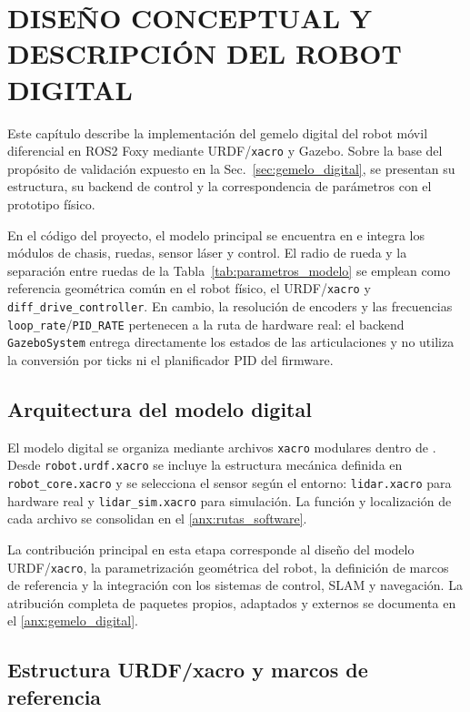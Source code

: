 \chapter{DISEÑO CONCEPTUAL Y DESCRIPCIÓN DEL ROBOT DIGITAL}
\label{ch:robot_digital}

Este capítulo describe la implementación del gemelo digital del robot móvil diferencial en \gls{ROS2} Foxy mediante URDF/\texttt{xacro} y Gazebo. Sobre la base del propósito de validación expuesto en la Sec.~\ref{sec:gemelo_digital}, se presentan su estructura, su backend de control y la correspondencia de parámetros con el prototipo físico.

En el código del proyecto, el modelo principal se encuentra en  e integra los módulos de chasis, ruedas, sensor láser y control. El radio de rueda y la separación entre ruedas de la Tabla~\ref{tab:parametros_modelo} se emplean como referencia geométrica común en el robot físico, el URDF/\texttt{xacro} y \texttt{diff\_drive\_controller}. En cambio, la resolución de encoders y las frecuencias \texttt{loop\_rate}/\texttt{PID\_RATE} pertenecen a la ruta de hardware real: el backend \texttt{GazeboSystem} entrega directamente los estados de las articulaciones y no utiliza la conversión por ticks ni el planificador PID del firmware.

\section{Arquitectura del modelo digital}
\label{sec:atribucion}

El modelo digital se organiza mediante archivos \texttt{xacro} modulares dentro de . Desde \texttt{robot.urdf.xacro} se incluye la estructura mecánica definida en \texttt{robot\_core.xacro} y se selecciona el sensor según el entorno: \texttt{lidar.xacro} para hardware real y \texttt{lidar\_sim.xacro} para simulación. La función y localización de cada archivo se consolidan en el \ref{anx:rutas_software}.

La contribución principal en esta etapa corresponde al diseño del modelo URDF/\texttt{xacro}, la parametrización geométrica del robot, la definición de marcos de referencia y la integración con los sistemas de control, SLAM y navegación. La atribución completa de paquetes propios, adaptados y externos se documenta en el \ref{anx:gemelo_digital}.

\section{Estructura URDF/xacro y marcos de referencia}
\label{sec:tf-convenciones}

